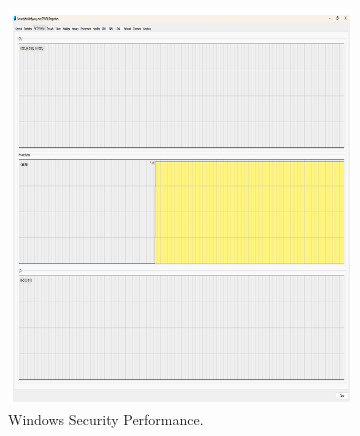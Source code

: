 \documentclass[11pt]{article}
\begin{document}
	\begin{figure}[H]
		\centering
		\begin{subfigure}{0.48\linewidth}
			\centering
			\includegraphics[width=\linewidth]{Pictures/perf_winsecurity.png} %
			\caption{Windows Security Performance.}
			\label{fig:perf_winsec}
		\end{subfigure}
		\hfill
		\begin{subfigure}{0.48\linewidth}
			\centering

\end{subfigure}
\end{figure}
\end{document}
